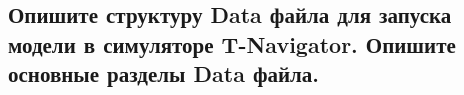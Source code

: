 

\subsection{Опишите структуру Data файла для запуска модели в симуляторе T-Navigator. Опишите основные разделы Data файла.}

